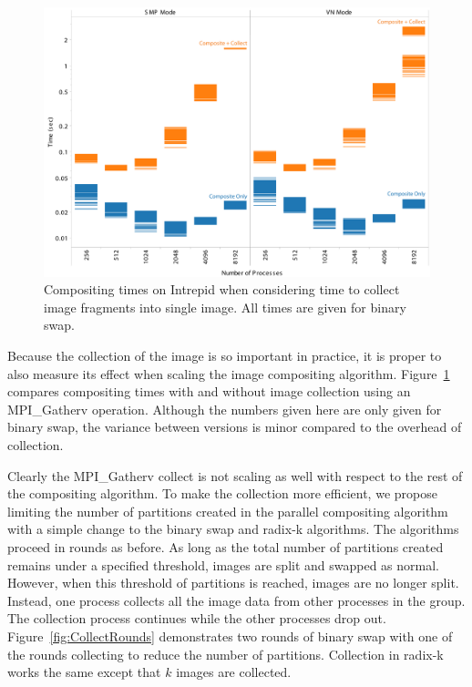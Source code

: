 \documentclass{acm_proc_article-sp}
\begin{document}
\begin{figure}[htbp]
  \centering
  \includegraphics[width=\linewidth]{images/PartitionCollectIntrepidFull}
  \caption{Compositing times on Intrepid when considering time to collect
    image fragments into single image.  All times are given for binary
    swap.}
  \label{fig:PartitionCollectFull}
\end{figure}

Because the collection of the image is so important in practice, it is
proper to also measure its effect when scaling the image compositing
algorithm.  Figure~\ref{fig:PartitionCollectFull} compares compositing
times with and without image collection using an MPI\_Gatherv operation.
Although the numbers given here are only given for binary swap, the
variance between versions is minor compared to the overhead of collection.

Clearly the MPI\_Gatherv collect is not scaling as well with respect to the
rest of the compositing algorithm.  To make the collection more efficient,
we propose limiting the number of partitions created in the parallel
compositing algorithm with a simple change to the binary swap and radix-k
algorithms.  The algorithms proceed in rounds as before.  As long as the
total number of partitions created remains under a specified threshold,
images are split and swapped as normal.  However, when this threshold of
partitions is reached, images are no longer split.  Instead, one process
collects all the image data from other processes in the group.  The
collection process continues while the other processes drop out.
Figure~\ref{fig:CollectRounds} demonstrates two rounds of binary swap with
one of the rounds collecting to reduce the number of partitions.
Collection in radix-k works the same except that $k$ images are collected.
\end{document}
